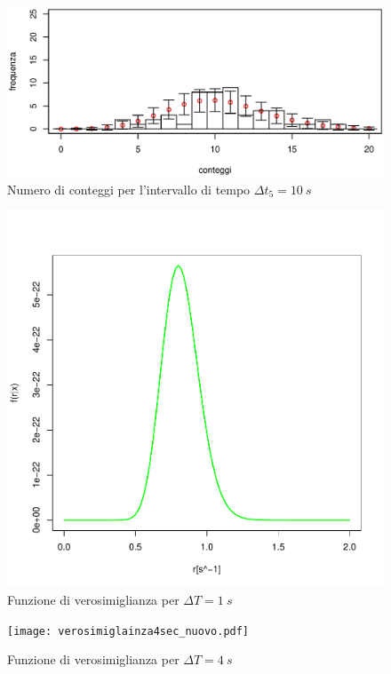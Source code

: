 \documentclass[10pt,oneside,a4paper]{article}
\begin{document}
\begin{figure}[H]
\caption{Numero di conteggi per l'intervallo di tempo $\Delta t_5 = \SI{10}{s}$}
\label{fig:istogramma_deltat5}
\centering
\includegraphics[scale=0.7]{ist_cinque_nuovo.eps}
\end{figure}


\begin{figure}
\caption{Funzione di verosimiglianza per $\Delta T = \SI{1}{s}$}
\label{fig:verosimiglianza1sec}
\centering
\includegraphics[scale=0.5]{verosimiglianza1sec_nuovo.pdf}
\end{figure}

\begin{figure}
\caption{Funzione di verosimiglianza per $\Delta T = \SI{4}{s}$}
\label{fig:verosimiglianza4sec}
\texttt{[image: verosimiglainza4sec\_nuovo.pdf]}
\centering
\end{figure}
\end{document}
